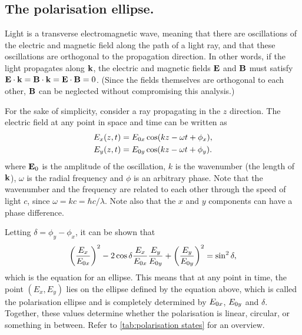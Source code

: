\subsection{The polarisation ellipse.} Light is a transverse electromagnetic wave, meaning that there are oscillations of the electric and magnetic field along the path of a light ray, and that these oscillations are orthogonal to the propagation direction. In other words, if the light propagates along $\vb{k}$, the electric and magnetic fields $\vb{E}$ and $\vb{B}$ must satisfy $ \vb{E} \cdot \vb{k} = \vb{B} \cdot \vb{k} = \vb{E} \cdot \vb{B} = 0$. (Since the fields themselves are orthogonal to each other, $ \vb{B} $ can be neglected without compromising this analysis.)

For the sake of simplicity, consider a ray propagating in the $ z $ direction. The electric field at any point in space and time can be written as
\begin{align}
	E_x(z, t) &= E_{0x} \cos(kz-\omega t + \phi_x),\\
	E_y(z, t) &= E_{0y} \cos(kz-\omega t + \phi_y).
\end{align}
where $ \vb{E}_0 $ is the amplitude of the oscillation, $ k $ is the wavenumber (the length of $ \vb{k} $), $ \omega $ is the radial frequency and $ \phi$ is an arbitrary phase. Note that the wavenumber and the frequency are related to each other through the speed of light $ c $, since $ \omega = kc = \hbar c/\lambda$. Note also that the $ x $ and $ y $ components can have a phase difference.

Letting $ \delta = \phi_y-\phi_x $, it can be shown that 
\begin{equation}
	\left(\frac{E_x}{E_{0x}}\right)^2 - 2\cos\delta\frac{E_x}{E_{0x}}\frac{E_y}{E_{0y}} + \left(\frac{E_y}{E_{0y}}\right)^2 = \sin^2\delta,
\end{equation}
which is the equation for an ellipse. This means that at any point in time, the point $ (E_x, E_y) $ lies on the ellipse defined by the equation above, which is called the polarisation ellipse and is completely determined by $ E_{0x} $, $ E_{0y} $ and $ \delta $. Together, these values determine whether the polarisation is linear, circular, or something in between. Refer to \autoref{tab:polarisation states} for an overview.

